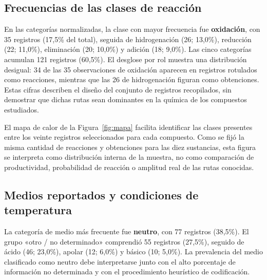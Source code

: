 \subsection{Frecuencias de las clases de reacción}
En las categorías normalizadas, la clase con mayor frecuencia fue \textbf{oxidación}, con 35 registros (17,5\% del total), seguida de hidrogenación (26; 13,0\%), reducción (22; 11,0\%), eliminación (20; 10,0\%) y adición (18; 9,0\%). Las cinco categorías acumulan 121 registros (60,5\%). El desglose por rol muestra una distribución desigual: 34 de las 35 observaciones de oxidación aparecen en registros rotulados como reacciones, mientras que las 26 de hidrogenación figuran como obtenciones. Estas cifras describen el diseño del conjunto de registros recopilados, sin demostrar que dichas rutas sean dominantes en la química de los compuestos estudiados.



El mapa de calor de la Figura~\ref{fig:mapa} facilita identificar las clases presentes entre los veinte registros seleccionados para cada compuesto. Como se fijó la misma cantidad de reacciones y obtenciones para las diez sustancias, esta figura se interpreta como distribución interna de la muestra, no como comparación de productividad, probabilidad de reacción o amplitud real de las rutas conocidas.

\subsection{Medios reportados y condiciones de temperatura}
La categoría de medio más frecuente fue \textbf{neutro}, con 77 registros (38,5\%). El grupo «otro / no determinado» comprendió 55 registros (27,5\%), seguido de ácido (46; 23,0\%), apolar (12; 6,0\%) y básico (10; 5,0\%). La prevalencia del medio clasificado como neutro debe interpretarse junto con el alto porcentaje de información no determinada y con el procedimiento heurístico de codificación.



